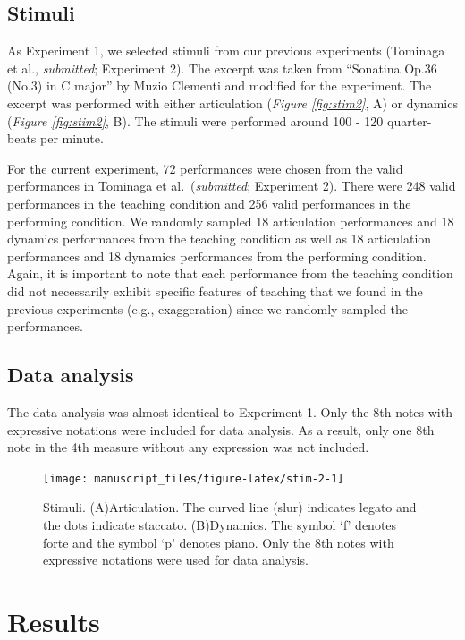\documentclass[
  man,floatsintext]{apa6}
\begin{document}
\hypertarget{stimuli-1}{%
\subsection{Stimuli}\label{stimuli-1}}

As Experiment 1, we selected stimuli from our previous experiments (Tominaga et al., \emph{submitted}; Experiment 2). The excerpt was taken from ``Sonatina Op.36 (No.3) in C major'' by Muzio Clementi and modified for the experiment. The excerpt was performed with either articulation (\emph{Figure \ref{fig:stim2}}, A) or dynamics (\emph{Figure \ref{fig:stim2}}, B). The stimuli were performed around 100 - 120 quarter-beats per minute.

For the current experiment, 72 performances were chosen from the valid performances in Tominaga et al.~(\emph{submitted}; Experiment 2). There were 248 valid performances in the teaching condition and 256 valid performances in the performing condition. We randomly sampled 18 articulation performances and 18 dynamics performances from the teaching condition as well as 18 articulation performances and 18 dynamics performances from the performing condition. Again, it is important to note that each performance from the teaching condition did not necessarily exhibit specific features of teaching that we found in the previous experiments (e.g., exaggeration) since we randomly sampled the performances.

\hypertarget{data-analysis-1}{%
\subsection{Data analysis}\label{data-analysis-1}}

The data analysis was almost identical to Experiment 1. Only the 8th notes with expressive notations were included for data analysis. As a result, only one 8th note in the 4th measure without any expression was not included.

\begin{figure}
\texttt{[image: manuscript\_files/figure-latex/stim-2-1]} \caption{\label{fig:stim2}Stimuli. (A)Articulation. The curved line (slur) indicates legato and the dots indicate staccato. (B)Dynamics. The symbol `f' denotes forte and the symbol `p' denotes piano. Only the 8th notes with expressive notations were used for data analysis.}\label{fig:stim-2}
\end{figure}

\hypertarget{results-1}{%
\section{Results}\label{results-1}}
\end{document}
